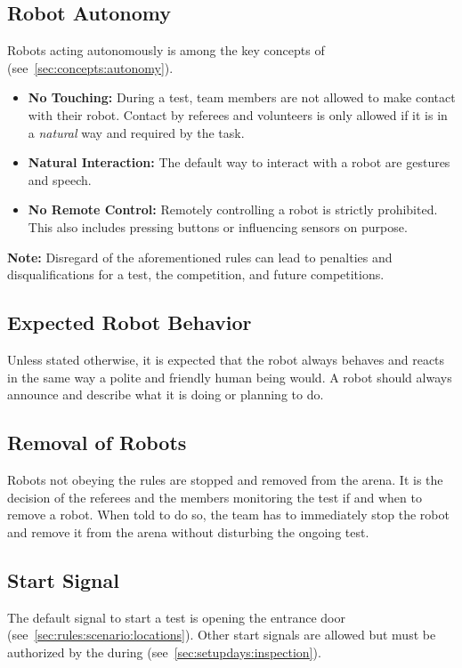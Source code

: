 \subsection{Robot Autonomy}
\label{sec:rules:autonomy}
Robots acting autonomously is among the key concepts of \AtHome{} (see~\ref{sec:concepts:autonomy}).
\begin{itemize}
	\item \textbf{No Touching:} During a test, team members are not allowed to make contact with their robot. Contact by referees and volunteers is only allowed if it is in a \textit{natural} way and required by the task.

	\item \textbf{Natural Interaction:} The default way to interact with a robot are gestures and speech.

	\item \textbf{No Remote Control:} Remotely controlling a robot is strictly prohibited.
	This also includes pressing buttons or influencing sensors on purpose.
\end{itemize}

\noindent\textbf{Note:} Disregard of the aforementioned rules can lead to penalties and disqualifications for a test, the competition, and future competitions.

\subsection{Expected Robot Behavior}
\label{sec:rules:robotbehavior}
Unless stated otherwise, it is expected that the robot always behaves and reacts in the same way a polite and friendly human being would.
A robot should always announce and describe what it is doing or planning to do.

\subsection{Removal of Robots}
\label{sec:rules:robotremoval}
Robots not obeying the rules are stopped and removed from the arena. It is the decision of the referees and the  members monitoring the test if and when to remove a robot. When told to do so, the team has to immediately stop the robot and remove it from the arena without disturbing the ongoing test.


\subsection{Start Signal}
\label{sec:rules:startsignal}
The default signal to start a test is opening the entrance door (see~\ref{sec:rules:scenario:locations}).
Other start signals are allowed but must be authorized by the  during \RobotInspection{} (see~\ref{sec:setupdays:inspection}).

